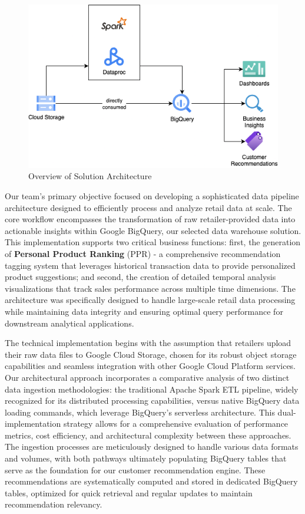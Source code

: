 \begin{figure}[htp]
    \centering
    \includegraphics[width=0.5\linewidth]{images/solution_architecture.png}
    \caption{Overview of Solution Architecture}
\end{figure}

Our team's primary objective focused on developing a sophisticated data pipeline architecture
designed to efficiently process and analyze retail data at scale. The core workflow encompasses the
transformation of raw retailer-provided data into actionable insights within Google BigQuery, our
selected data warehouse solution. This implementation supports two critical business functions:
first, the generation of \textbf{Personal Product Ranking} (PPR) - a comprehensive recommendation
tagging system that leverages historical transaction data to provide personalized product
suggestions; and second, the creation of detailed temporal analysis visualizations that track sales
performance across multiple time dimensions. The architecture was specifically designed to handle
large-scale retail data processing while maintaining data integrity and ensuring optimal query
performance for downstream analytical applications.

The technical implementation begins with the assumption that retailers upload their raw data files
to Google Cloud Storage, chosen for its robust object storage capabilities and seamless integration
with other Google Cloud Platform services. Our architectural approach incorporates a comparative
analysis of two distinct data ingestion methodologies: the traditional Apache Spark ETL pipeline,
widely recognized for its distributed processing capabilities, versus native BigQuery data loading
commands, which leverage BigQuery's serverless architecture. This dual-implementation strategy
allows for a comprehensive evaluation of performance metrics, cost efficiency, and architectural
complexity between these approaches. The ingestion processes are meticulously designed to handle
various data formats and volumes, with both pathways ultimately populating BigQuery tables that
serve as the foundation for our customer recommendation engine. These recommendations are
systematically computed and stored in dedicated BigQuery tables, optimized for quick retrieval and
regular updates to maintain recommendation relevancy.

